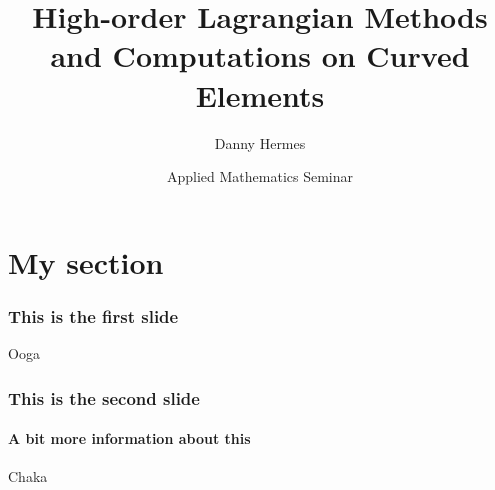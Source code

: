 \documentclass{beamer}
\title[Lagrange and B\'{e}zier]
  {High-order Lagrangian Methods and Computations on Curved Elements}
\author{Danny Hermes}
\institute{UC Berkeley}
\date[August 10, 2018]{Applied Mathematics Seminar}
\begin{document}
\begin{frame}
  \titlepage
\end{frame}

\section[Z Section]{My section}

\begin{frame}
  \frametitle{This is the first slide}
  Ooga
\end{frame}

\begin{frame}
  \frametitle{This is the second slide}
  \framesubtitle{A bit more information about this}
  Chaka
\end{frame}
\end{document}
